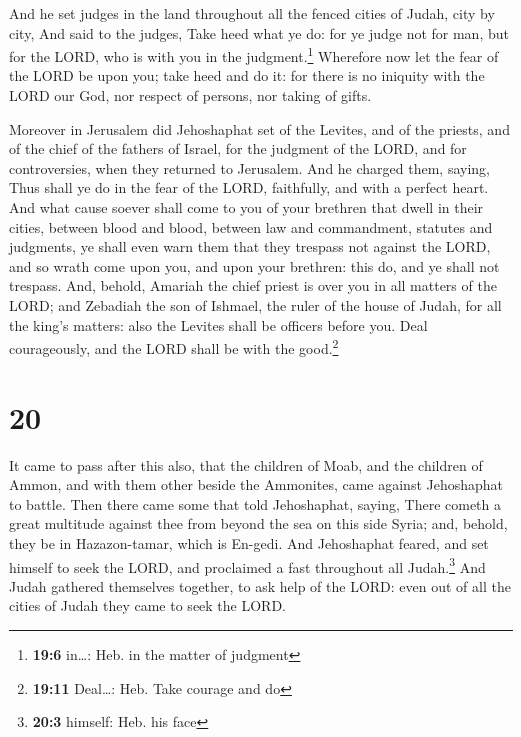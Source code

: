  And he set judges in the land throughout all the fenced
cities of Judah, city by city,  And said to the judges,
Take heed what ye do: for ye judge not for man, but for the LORD, who is
with you in the judgment.\footnote{\textbf{19:6} in\ldots: Heb. in the
  matter of judgment}  Wherefore now let the fear of the
LORD be upon you; take heed and do it: for there is no iniquity with the
LORD our God, nor respect of persons, nor taking of gifts.

 Moreover in Jerusalem did Jehoshaphat set of the Levites,
and of the priests, and of the chief of the fathers of Israel, for the
judgment of the LORD, and for controversies, when they returned to
Jerusalem.  And he charged them, saying, Thus shall ye do
in the fear of the LORD, faithfully, and with a perfect heart.
 And what cause soever shall come to you of your brethren
that dwell in their cities, between blood and blood, between law and
commandment, statutes and judgments, ye shall even warn them that they
trespass not against the LORD, and so wrath come upon you, and upon your
brethren: this do, and ye shall not trespass.  And,
behold, Amariah the chief priest is over you in all matters of the LORD;
and Zebadiah the son of Ishmael, the ruler of the house of Judah, for
all the king's matters: also the Levites shall be officers before you.
Deal courageously, and the LORD shall be with the good.\footnote{\textbf{19:11}
  Deal\ldots: Heb. Take courage and do}

\hypertarget{section-19}{%
\section{20}\label{section-19}}

 It came to pass after this also, that the children of
Moab, and the children of Ammon, and with them other beside the
Ammonites, came against Jehoshaphat to battle.  Then there
came some that told Jehoshaphat, saying, There cometh a great multitude
against thee from beyond the sea on this side Syria; and, behold, they
be in Hazazon-tamar, which is En-gedi.  And Jehoshaphat
feared, and set himself to seek the LORD, and proclaimed a fast
throughout all Judah.\footnote{\textbf{20:3} himself: Heb. his face}
 And Judah gathered themselves together, to ask help of
the LORD: even out of all the cities of Judah they came to seek the
LORD.

